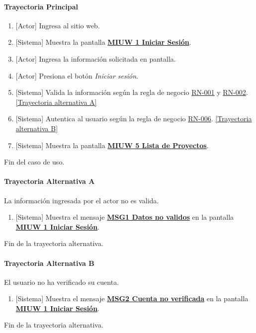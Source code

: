 \paragraph{Trayectoria Principal}
	\begin{enumerate}
	    \item {[Actor]} Ingresa al sitio web.
	    \item {[Sistema]} Muestra la pantalla \hyperref[fig:MIUW-1]{\bf MIUW 1 Iniciar Sesión}.
	    \item {[Actor]} Ingresa la información solicitada en pantalla.
	    \item {[Actor]} Presiona el botón \textit{Iniciar sesión}.
	    \item {[Sistema]} Valida la información según la regla de negocio \hyperref[RN001]{RN-001} y \hyperref[RN002]{RN-002}. \hyperref[W-USR-CU2:TA]{[Trayectoria alternativa A]}
	    \item {[Sistema]} Autentica al usuario según la regla de negocio \hyperref[RN006]{RN-006}. \hyperref[W-USR-CU2:TB]{[Trayectoria alternativa B]}
	    \item {[Sistema]} Muestra la pantalla \hyperref[fig:MIUW-5]{\bf MIUW 5 Lista de Proyectos}.
	\end{enumerate}
	Fin del caso de uso.

\paragraph{Trayectoria Alternativa A} \label{W-USR-CU2:TA}
	La información ingresada por el actor no es valida.
	\begin{enumerate}[label=A\arabic*.]
		\item {[Sistema]} Muestra el mensaje \hyperref[MSG1]{\bf MSG1 Datos no validos} en la pantalla \hyperref[fig:MIUW-1]{\bf MIUW 1 Iniciar Sesión}.
	\end{enumerate}
	Fin de la trayectoria alternativa.
\paragraph{Trayectoria Alternativa B} \label{W-USR-CU2:TB}
	El usuario no ha verificado su cuenta.
	\begin{enumerate}[label=B\arabic*.]
		\item {[Sistema]} Muestra el mensaje \hyperref[MSG2]{\bf MSG2 Cuenta no verificada} en la pantalla \hyperref[fig:MIUW-1]{\bf{MIUW 1 Iniciar Sesión}}.
	\end{enumerate}
	Fin de la trayectoria alternativa.